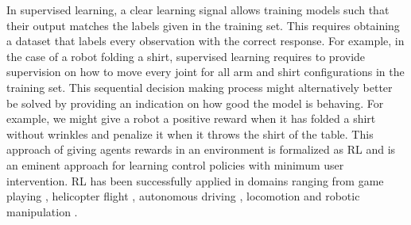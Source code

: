 \documentclass[\home/main.tex]{subfiles}
\begin{document}
In supervised learning, a clear learning signal allows training models such that their output matches the labels given in the training set. This requires obtaining a dataset that labels every observation with the correct response. For example, in the case of a robot folding a shirt, supervised learning requires to provide supervision on how to move every joint for all arm and shirt configurations in the training set. This sequential decision making process might alternatively better be solved by providing an indication on how good the model is behaving. For example, we might give a robot a positive reward when it has folded a shirt without wrinkles and penalize it when it throws the shirt of the table. This approach of giving agents rewards in an environment is formalized as \gls{RL} and is an eminent approach for learning control policies with minimum user intervention. RL has been successfully applied in domains ranging from game playing \autocite{mnih2015human}, helicopter flight \autocite{ng2003autonomous}, autonomous driving \autocite{sallab2017deep}, locomotion \autocite{tan2018sim} and robotic manipulation \autocite{levine2016end}.
\end{document}
